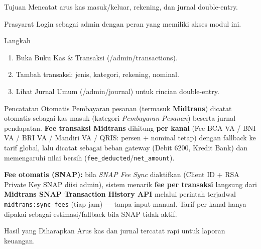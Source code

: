 
\begin{flowsection}{Tujuan}
Mencatat arus kas masuk/keluar, rekening, dan jurnal double-entry.
\end{flowsection}

\begin{flowsection}{Prasyarat}
Login sebagai admin dengan peran yang memiliki akses modul ini.
\end{flowsection}

\begin{flowsection}{Langkah}
\begin{enumerate}
  \item Buka Buku Kas \&  Transaksi (/admin/transactions).
  \item Tambah transaksi: jenis, kategori, rekening, nominal.
  \item Lihat Jurnal Umum (/admin/journal) untuk rincian double-entry.
\end{enumerate}
\end{flowsection}


\begin{flowsection}{Pencatatan Otomatis}
Pembayaran pesanan (termasuk \textbf{Midtrans}) dicatat otomatis sebagai kas
masuk (kategori \emph{Pembayaran Pesanan}) beserta jurnal pendapatan. \textbf{Fee
transaksi Midtrans} dihitung \textbf{per kanal} (Fee BCA VA / BNI VA / BRI VA /
Mandiri VA / QRIS: persen + nominal tetap) dengan fallback ke tarif global, lalu
dicatat sebagai beban gateway (Debit 6200, Kredit Bank) dan memengaruhi nilai
bersih (\texttt{fee\_deducted}/\texttt{net\_amount}).

\textbf{Fee otomatis (SNAP):} bila \emph{SNAP Fee Sync} diaktifkan (Client ID +
RSA Private Key SNAP diisi admin), sistem menarik \textbf{fee per transaksi}
langsung dari \textbf{Midtrans SNAP Transaction History API} melalui perintah
terjadwal \texttt{midtrans:sync-fees} (tiap jam) — tanpa input manual. Tarif per
kanal hanya dipakai sebagai estimasi/fallback bila SNAP tidak aktif.
\end{flowsection}

\begin{flowsection}{Hasil yang Diharapkan}
Arus kas dan jurnal tercatat rapi untuk laporan keuangan.
\end{flowsection}

